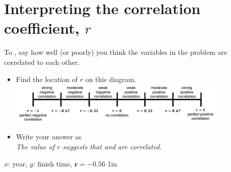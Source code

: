 \section{Interpreting the correlation coefficient, $r$}

\begin{tcolorbox}[center,width=5.5in]
    \small
    To  ,
    say how well (or poorly) you think the variables in the problem
    are correlated to each other.
    \begin{itemize}[nosep]
        \item Find the location of $r$ on this diagram.\\
        {
            \centering
            \includegraphics[height=0.8in]{correlation-strengths.png}
        }
        \item Write your answer as\\
        {
            \small\itshape 
            The value of $r$ suggests that 
             and 
            are 
            \underline{\hspace{1.5in}} correlated.
        }
    \end{itemize}
\end{tcolorbox}

{
    $x$: year, $y$: finish time, \hfill $\bm{r}=-0.56$
}
{1in}